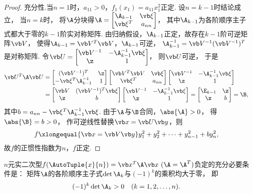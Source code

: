 \begin{theorem}
\begin{proof}
充分性.当\(n=1\)时，\(a_{11} > 0\)，\(f_1(x_1) = a_{11} x_1^2\)正定.
设\(n=k-1\)时结论成立，
当\(n=k\)时，
将\(\A\)分块得\(\A = \begin{bmatrix}
	\A_{k-1} & \a \\
	\a^T & a_{nn}
\end{bmatrix}\)，
其中\(\A_{k-1}\)为各阶顺序主子式都大于零的\(k-1\)阶实对称矩阵.
由归纳假设，\(\A_{k-1}\)正定，故存在\(k-1\)阶可逆矩阵\(\Q\)，
使得\(\A_{k-1} = \Q^T \Q\)，\(\A_{k-1}\)可逆，
\(\A_{k-1}^{-1} = \Q^{-1}(\Q^{-1})^T\)是对称矩阵.
令\(\P = \begin{bmatrix}
	\Q^{-1} & -\A_{k-1}^{-1} \a \\
	\z & 1
\end{bmatrix}\)，
则\(\P\)可逆，
于是\begin{align*}
	\P^T \A \P &= \begin{bmatrix}
		(\Q^{-1})^T & \z \\
		-\a^T \A_{k-1}^{-1} & 1
	\end{bmatrix}
	\begin{bmatrix}
		\Q^T \Q & \a \\
		\a^T & a_{nn}
	\end{bmatrix}
	\begin{bmatrix}
		\Q^{-1} & -\A_{k-1}^{-1} \a \\
		\z & 1
	\end{bmatrix} \\
	&= \begin{bmatrix}
		\Q & (\Q^{-1})^T \a \\
		\z & b
	\end{bmatrix}
	\begin{bmatrix}
		\Q^{-1} & -\A_{k-1}^{-1} \a \\
		\z & 1
	\end{bmatrix}
	= \begin{bmatrix}
		\E_{k-1} & \z \\
		\z & b
	\end{bmatrix} = \B,
\end{align*}
其中\(b=a_{nn}-\a^T \A_{k-1}^{-1} \a\).
由于\(\A\)与\(\B\)合同，\(\abs{\A} > 0\)，
得\(\abs{\B} = b > 0\)，
作可逆线性替换\(\x = \P\y\)，则\[
	f \xlongequal{\x=\Q\y} y_1^2 + y_2^2 + \dotsb + y_{n-1}^2 + b y_n^2,
\]
故\(f\)的正惯性指数为\(n\)，\(f\)正定.
\end{proof}
\end{theorem}

\begin{corollary}
\(n\)元实二次型\(f(\AutoTuple{x}{n}) = \x^T\A\x\ (\A=\A^T)\)负定的充分必要条件是：
矩阵\(\A\)的各阶顺序主子式\(\det\A_k\)与\((-1)^k\)的乘积均大于零，
即\[
	(-1)^k \det\A_k > 0
	\quad(k=1,2,\dotsc,n).
\]
\end{corollary}

